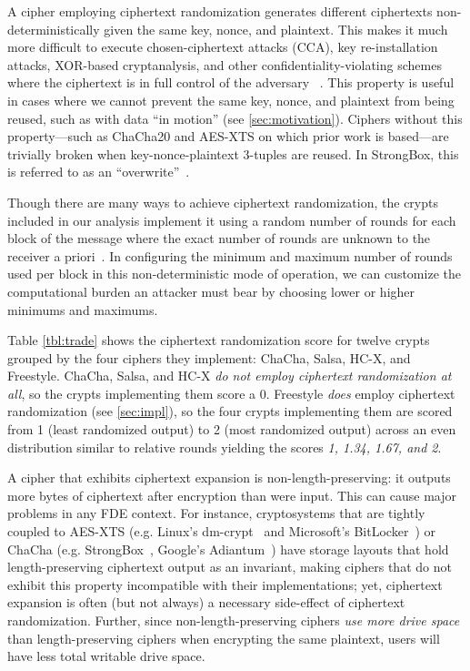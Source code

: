 
 A cipher employing ciphertext
randomization generates different ciphertexts non-deterministically given the
same key, nonce, and plaintext. This makes it much more difficult to execute
chosen-ciphertext attacks (CCA), key re-installation attacks, XOR-based
cryptanalysis, and other confidentiality-violating schemes where the ciphertext
is in full control of the adversary ~\cite{Freestyle}. This property is useful
in cases where we cannot prevent the same key, nonce, and plaintext from being
reused, such as with data ``in motion'' (see \cref{sec:motivation}). Ciphers
without this property---such as ChaCha20 and AES-XTS on which prior work is
based---are trivially broken when key-nonce-plaintext 3-tuples are reused. In
StrongBox, this is referred to as an ``overwrite''~\cite{StrongBox}.

Though there are many ways to achieve ciphertext randomization, the crypts
included in our analysis implement it using a random number of rounds for each
block of the message where the exact number of rounds are unknown to the
receiver a priori~\cite{Freestyle}. In configuring the minimum and maximum
number of rounds used per block in this non-deterministic mode of operation, we
can customize the computational burden an attacker must bear by choosing lower
or higher minimums and maximums.

Table \cref{tbl:trade} shows the ciphertext randomization score for twelve
crypts grouped by the four ciphers they implement: ChaCha, Salsa, HC-X, and
Freestyle. ChaCha, Salsa, and HC-X {\em do not employ ciphertext randomization
at all}, so the crypts implementing them score a 0. Freestyle {\em does} employ
ciphertext randomization (see \cref{sec:impl}), so the four crypts implementing
them are scored from 1 (least randomized output) to 2 (most randomized output)
across an even distribution similar to relative rounds yielding the scores {\em
1, 1.34, 1.67, and 2}.


 A cipher that exhibits ciphertext
expansion is non-length-preserving: it outputs more bytes of ciphertext after
encryption than were input. This can cause major problems in any FDE context.
For instance, cryptosystems that are tightly coupled to AES-XTS (e.g. Linux's
dm-crypt~\cite{dmcrypt} and Microsoft's BitLocker~\cite{bitlocker1}) or ChaCha
(e.g. StrongBox~\cite{StrongBox}, Google's Adiantum~\cite{Adiantum}) have
storage layouts that hold length-preserving ciphertext output as an invariant,
making ciphers that do not exhibit this property incompatible with their
implementations; yet, ciphertext expansion is often (but not always) a necessary
side-effect of ciphertext randomization. Further, since non-length-preserving
ciphers {\em use more drive space} than length-preserving ciphers when
encrypting the same plaintext, users will have less total writable drive space.

